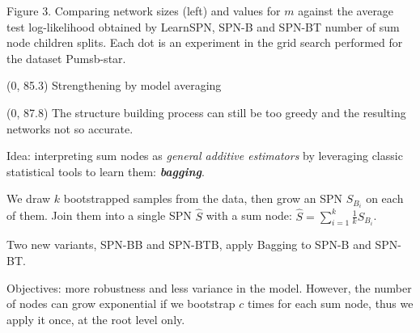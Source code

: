 \documentclass[final]{beamer}
\begin{document}
\begin{frame}{}
\begin{textblock}{25.2}
    \vspace{-20pt}
    \begin{center}
      \begin{minipage}[t]{0.9\linewidth}
        \tiny\flushleft
        Figure 3. Comparing network sizes (left) and values for $m$
        against the  average test
        log-likelihood obtained by \textsf{LearnSPN}, \textsf{SPN-B} and
        \textsf{SPN-BT}
        number of sum node children splits. Each dot is an experiment
        in the grid search performed for the dataset Pumsb-star.
      \end{minipage}
    \end{center}

  \end{textblock}
  
  
  
  \begin{textblock}{80}(0, 85.3)
    Strengthening by model averaging
  \end{textblock}
  
  \begin{textblock}{25.2}(0, 87.8)
    \footnotesize
    The structure building process can still be too greedy and the
    resulting networks not so accurate.\par\bigskip
    
    Idea: interpreting sum nodes as \emph{general additive estimators}
    by leveraging
    classic statistical tools to learn them:
    \textbf{\emph{bagging}}.\par\bigskip

    We draw $k$ bootstrapped samples from the data, then grow an SPN $S_{B_i}$ on
    each of them. Join them into a single SPN $\hat{S}$ with a sum node:
    $\hat{S}=\sum_{i=1}^{k}\frac{1}{k}S_{B_{i}}$.\par\bigskip
    
    Two new variants, \textsf{SPN-BB} and
    \textsf{SPN-BTB}, apply \textsf{B}agging to \textsf{SPN-B} and \textsf{SPN-BT}.\par\bigskip

    Objectives: more robustness and less variance in the model.
    However, the number of nodes can grow exponential if we bootstrap
    $c$ times for each sum node, thus we
    apply it once, at the root level only.


\end{textblock}
\end{frame}
\end{document}
